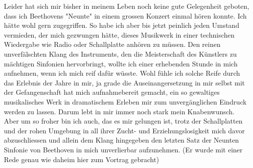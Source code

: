 \def\day{21. April 1943}
\mktitle

Leider hat sich mir bisher in meinem Leben noch keine gute Gelegenheit geboten, dass ich Beethovens "Neunte" in einem grossen Konzert einmal h\"{o}ren konnte.
Ich h\"{a}tte wohl gern zugegriffen.
So habe ich aber bis jetzt peinlich jeden Umstand vermieden, der mich gezwungen h\"{a}tte, dieses Musikwerk in einer technischen  Wiedergabe wie Radio oder Schallplatte anh\"{o}ren zu m\"{u}ssen.
Den reinen unverf\"{a}lschten Klang des Instruments, den die Meisterschaft des K\"{u}nstlers zu m\"{a}chtigen Sinfonien hervorbringt, wollte ich einer erhebenden Stunde in mich aufnehmen, wenn ich mich reif daf\"{u}r w\"{u}sste.
Wohl f\"{u}hle ich solche Reife durch das Erlebnis der Jahre in mir, ja grade die Auseinangersetzung in mir selbst mit der Gefangenschaft hat mich aufnahmebereit gemacht, ein so gewaltiges musikalisches Werk in dramatischem Erleben mir zum unverg\"{a}nglichen Eindruck werden zu lassen.
Darum lebt in mir immer noch stark mein Knabenwunsch.
Aber um so froher bin ich auch, das es mir gelungen ist, trotz der Schallplatten und der rohen Umgebung in all ihrer Zucht- und Erziehungslosigkeit mich davor abzuschliessen und allein dem Klang hingegeben den letzten Satz der Neunten Sinfonie von Beethoven in mich unverlierbar aufzunehmen.
(Er wurde mit einer Rede genau wie daheim hier zum Vortrag gebracht)

\clearpage
